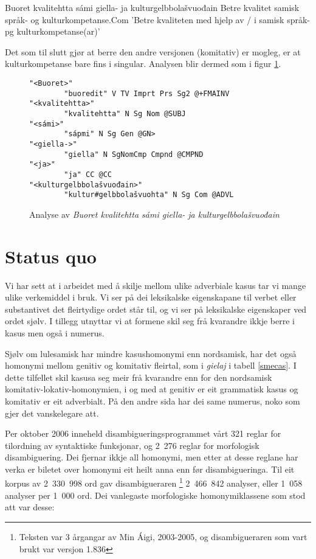 \documentclass[a4paper,norsk]{article}
\begin{document}
\begin{example}\label{kvali}
\gll Buoret kvalitehtta sámi giella- ja kulturgelbbolašvuođain
      Betre kvalitet samisk språk- og kulturkompetanse.Com
\glt 'Betre kvaliteten med hjelp av / i samisk språk- pg kulturkompetanse(ar)'
\glend
\end{example}


Det som til slutt gjør at berre den andre versjonen (komitativ) er mogleg, er  at kulturkompetanse bare fins i singular. Analysen blir dermed som i figur \ref{kvalianalyse}.%


\begin{figure}[htbp]
\begin{center}
\begin{verbatim}
"<Buoret>"
        "buoredit" V TV Imprt Prs Sg2 @+FMAINV
"<kvalitehtta>"
        "kvalitehtta" N Sg Nom @SUBJ
"<sámi>"
        "sápmi" N Sg Gen @GN>
"<giella->"
        "giella" N SgNomCmp Cmpnd @CMPND
"<ja>"
        "ja" CC @CC
"<kulturgelbbolašvuođain>"
        "kultur#gelbbolašvuohta" N Sg Com @ADVL
\end{verbatim}
\caption{Analyse av \textit{Buoret kvalitehtta sámi giella- ja kulturgelbbolašvuođain}}
\label{kvalianalyse}
\end{center}
\end{figure}


\section{Status quo}

Vi har sett at i arbeidet med å skilje mellom ulike adverbiale kasus tar vi mange ulike verkemiddel i bruk. Vi ser på dei leksikalske eigenskapane til verbet eller substantivet det fleirtydige ordet står til, og vi ser på leksikalske eigenskaper ved ordet sjølv. I tillegg utnyttar vi at formene skil seg frå kvarandre ikkje berre i kasus men også i numerus. %

Sjølv om lulesamisk har mindre kasushomonymi enn nordsamisk, har det også homonymi mellom genitiv og komitativ fleirtal, som i \textit{gielaj} i tabell \ref{smecas}. I dette tilfellet skil kasusa seg meir frå kvarandre enn for den nordsamisk komitativ-lokativ-homonymien, i og med at genitiv er eit grammatisk kasus og komitativ er eit adverbialt. På den andre sida har dei same numerus, noko som gjer det vanskelegare att. %

Per oktober 2006 inneheld disambigueringsprogrammet vårt 321 reglar for tilordning av syntaktiske funksjonar, og 2\ 276 reglar for morfologisk disambiguering. Dei fjernar ikkje all homonymi, men etter at desse reglane har verka er biletet over homonymi eit heilt anna enn før disambigueringa. Til eit korpus av 2\ 330\ 998 ord gav disambigueraren \footnote{Teksten var 3 årgangar av Min Áigi, 2003-2005, og disambigueraren som vart brukt var versjon 1.836} 2\ 466\ 842 analyser, eller 1\ 058 analyser per 1\ 000 ord. Dei vanlegaste morfologiske homonymiklassene som stod att var desse:
\end{document}
